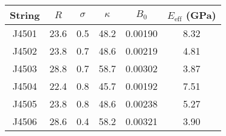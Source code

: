\begin{tabular}{cccccc}
\toprule
String & $R$ & $\sigma$ & $\kappa$ & $B_0$ & $E_\mathrm{eff}$ (GPa) \\
\midrule
J4501 & 23.6 & 0.5 & 48.2 & 0.00190 & 8.32 \\
J4502 & 23.8 & 0.7 & 48.6 & 0.00219 & 4.81 \\
J4503 & 28.8 & 0.7 & 58.7 & 0.00302 & 3.87 \\
J4504 & 22.4 & 0.8 & 45.7 & 0.00192 & 7.51 \\
J4505 & 23.8 & 0.8 & 48.6 & 0.00238 & 5.27 \\
J4506 & 28.6 & 0.4 & 58.2 & 0.00321 & 3.90 \\
\bottomrule
\end{tabular}

